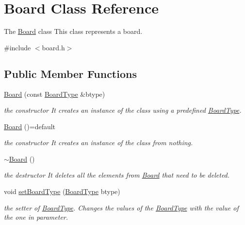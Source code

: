 \hypertarget{class_board}{}\section{Board Class Reference}
\label{class_board}


The \hyperlink{class_board}{Board} class This class represents a board.  




{\ttfamily \#include $<$board.\+h$>$}

\subsection*{Public Member Functions}
\begin{DoxyCompactItemize}
\item 
\hyperlink{class_board_ad42b2461203bc38788e8f3488a6a7636}{Board} (const \hyperlink{struct_board_type}{Board\+Type} \&btype)
\begin{DoxyCompactList}\small\item\em the constructor It creates an instance of the class using a predefined \hyperlink{struct_board_type}{Board\+Type}. \end{DoxyCompactList}\item 
\mbox{\label{class_board_ae87b63aa7c19a7ef82f6d70cbb9c7646}} 
\hyperlink{class_board_ae87b63aa7c19a7ef82f6d70cbb9c7646}{Board} ()=default
\begin{DoxyCompactList}\small\item\em the constructor It creates an instance of the class from nothing. \end{DoxyCompactList}\item 
\mbox{\label{class_board_af73f45730119a1fd8f6670f53f959e68}} 
\hyperlink{class_board_af73f45730119a1fd8f6670f53f959e68}{$\sim$\+Board} ()
\begin{DoxyCompactList}\small\item\em the destructor It deletes all the elements from \hyperlink{class_board}{Board} that need to be deleted. \end{DoxyCompactList}\item 
void \hyperlink{class_board_a5667cea4135532fa7666bf7f5cf6e71b}{set\+Board\+Type} (\hyperlink{struct_board_type}{Board\+Type} btype)
\begin{DoxyCompactList}\small\item\em the setter of \hyperlink{struct_board_type}{Board\+Type}. Changes the values of the \hyperlink{struct_board_type}{Board\+Type} with the value of the one in parameter. \end{DoxyCompactList}\item 

\end{DoxyCompactItemize}
